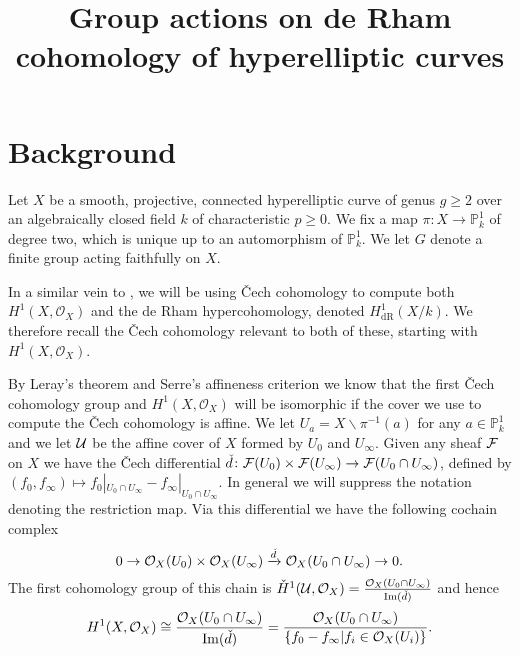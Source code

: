 \documentclass[draft, 11pt]{article} %
\title{Group actions on de Rham cohomology of hyperelliptic curves}
\author{}
\theoremstyle{plain}
\theoremstyle{remark}
\newcommand{\cO}{{\cal O}}
\newcommand{\cech}{\v{C}ech }
\newcommand{\hone}{H^1(X,\mathcal{O}_X)}
\newcommand{\cechhone}{\check{H}^1(\mathcal U,\mathcal O_X)}
\newcommand{\derhamhone}{H_{\text {dR}}^1(X/k)}
\DeclareMathOperator{\Ima}{Im}
\begin{document}
\maketitle

\listoftodos

\section{Background}

Let $X$ be a smooth, projective, connected hyperelliptic curve of genus $g \geq 2$ over an algebraically closed field $k$ of characteristic $p \geq 0$.
We  fix a map $\pi \colon X \rightarrow \mathbb P_k^1$ of degree two, which is unique up to an automorphism of $\mathbb P_k^1$.
We let $G$ denote a finite group acting faithfully on $X$.

In a similar vein to \cite{canonicalrepresentation}, we will be using \cech cohomology to compute both $\hone$ and the de Rham hypercohomology, denoted $\derhamhone$.
We therefore recall the \cech cohomology relevant to both of these, starting with $\hone$.

By Leray's theorem \cite[Thm 5.2.12]{liu} and Serre's affineness criterion \cite[Thm 5.2.23]{liu} we know that the first \cech cohomology group and $\hone$ will be isomorphic if the cover we use to compute the \cech cohomology is affine.
We let $U_a = X \backslash \pi^{-1}(a)$ for any $a \in \mathbb P_k^1$ and we let ${\cal U}$ be the affine cover of $X$ formed by $U_0$ and $U_\infty$.
Given any sheaf $\cal F$ on $X$ we have the \cech differential $\check{d}\colon {\cal F}(U_0) \times {\cal F} (U_\infty) \rightarrow {\cal F}(U_0 \cap U_\infty)$, defined by $(f_0,f_\infty) \mapsto f_0|_{U_0 \cap U_\infty} - f_\infty|_{U_0 \cap U_\infty}$.
In general we will suppress the notation denoting the restriction map.
Via this differential we have the following cochain complex
\begin{equation*}
0 \rightarrow \cO_X(U_0)\times \cO_X(U_\infty) \xrightarrow{\check{d}} \cO_X(U_0 \cap U_\infty) \rightarrow 0.
\end{equation*}
The first cohomology group of this chain is $\cechhone = \frac{\cO_X(U_0 \cap U_\infty)}{\Ima(\check{d})}$ and hence
\begin{equation}\label{cechhone}
\hone \cong \frac{\cO_X(U_0 \cap U_\infty)}{\Ima(\check{d})}  
 = \frac{\cO_X(U_0 \cap U_\infty)}{\{f_0 - f_\infty | f_i \in \cO_X(U_i) \}}.
\end{equation}
\end{document}

